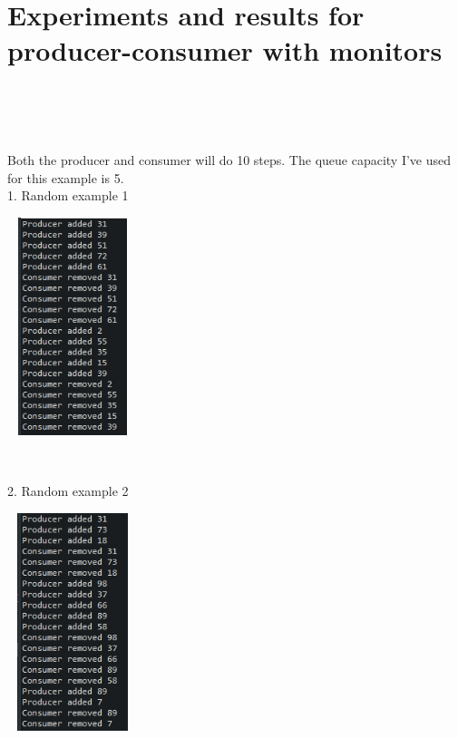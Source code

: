 \documentclass[14pt]{article}
\begin{document}
\section*{Experiments and results for producer-consumer with monitors}
\\\\\\
\begin{center}
Both the producer and consumer will do 10 steps. The queue capacity I've used for this example is 5.\\
1. Random example 1\\
\vspace{10mm}

\includegraphics[height=2.5in, width = 1.5in]{pcmon1.png}\\
\end{center}\\
\begin{center}
2. Random example 2\\
\vspace{10mm}

\includegraphics[height=2.5in, width = 1.5in]{pcmon2.png}\\
\end{center}\\
\end{document}
